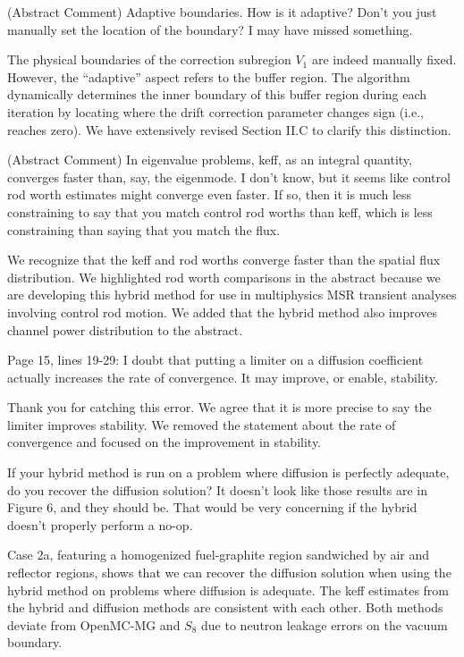 \documentclass[answers,11pt]{exam}
\begin{document}
\begin{questions}
    \question (Abstract Comment) Adaptive boundaries. How is it adaptive? Don't you just manually set the location of the boundary? I may have missed something.
    \begin{solution}
        The physical boundaries of the correction subregion $V_1$
        are indeed manually fixed. However, the ``adaptive'' aspect refers to the buffer region. The
        algorithm dynamically determines the inner boundary of this buffer region during each
        iteration by locating where the drift correction parameter changes sign (i.e., reaches
        zero). We have extensively revised Section II.C to clarify this distinction.
    \end{solution}

    \question (Abstract Comment) In eigenvalue problems, keff, as an integral quantity, converges faster than, say, the eigenmode. I don't know, but it seems like control rod worth estimates might converge even faster. If so, then it is much less constraining to say that you match control rod worths than keff, which is less constraining than saying that you match the flux.
    \begin{solution}
        We recognize that the keff and rod worths converge faster than the spatial flux
        distribution. We highlighted rod worth comparisons in the abstract because we are
        developing this hybrid method for use in multiphysics MSR transient analyses involving
        control rod motion. We added that the hybrid method also improves channel power distribution
        to the abstract.
    \end{solution}

    \question Page 15, lines 19-29: I doubt that putting a limiter on a diffusion coefficient actually increases the rate of convergence. It may improve, or enable, stability.
    \begin{solution}
        Thank you for catching this error. We agree that it is more precise to say the limiter
        improves stability. We removed the statement about the rate of convergence and focused on
        the improvement in stability.
    \end{solution}

    \question If your hybrid method is run on a problem where diffusion is perfectly adequate, do you recover the diffusion solution? It doesn't look like those results are in Figure 6, and they should be. That would be very concerning if the hybrid doesn't properly perform a no-op.
    \begin{solution}
        Case 2a, featuring a homogenized fuel-graphite region sandwiched by air and reflector
        regions, shows that we can recover the diffusion solution when using the hybrid
        method on problems where diffusion is adequate. The keff estimates from the hybrid and
        diffusion methods are consistent with each other. Both methods deviate from OpenMC-MG and
        $S_8$ due to neutron leakage errors on the vacuum boundary.
    \end{solution}


\end{questions}
\end{document}
